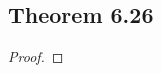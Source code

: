 \documentclass[../../main.tex]{subfiles}
\begin{document}
\subsection{Theorem 6.26}
\begin{wts}

\end{wts}
\begin{proof}

\end{proof}
\end{document}
